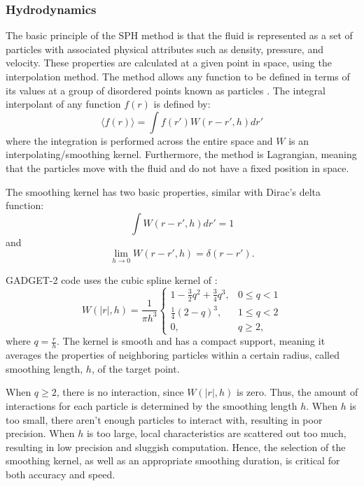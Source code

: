\subsubsection{Hydrodynamics}

The basic principle of the SPH method is that the fluid is represented as a set of particles with associated physical attributes such as density, pressure, and velocity. These properties are calculated at a given point in space, using the interpolation method. The method allows any function to be defined in terms of its values at a group of disordered points known as particles \citep{monaghan1982particle}. The integral interpolant of any function $f(r)$ is defined by:
\begin{equation}\label{eq:interpolant}
    \langle f(r) \rangle = \int f(r') W(r-r',h) dr'
\end{equation}
where the integration is performed across the entire space and $W$ is an interpolating/smoothing kernel. Furthermore, the method is Lagrangian, meaning that the particles move with the fluid and do not have a fixed position in space.

The smoothing kernel has two basic properties, similar with Dirac's delta function:
\begin{equation}\label{eq:kernel_property_1}
    \int W(r-r',h) dr' = 1
\end{equation}
and
\begin{equation}\label{eq:kernel_property_2}
   \lim_{h\to0} W(r-r',h) = \delta(r-r').
\end{equation}

GADGET-2 code uses the cubic spline kernel of \cite{monaghan1985refined}:
\begin{equation}\label{eq:spline_kernel}
  W(|r|,h) = \frac{1}{\pi h^3}
    \begin{cases}
      1 - \frac{3}{2}q^2 + \frac{3}{4}q^3, & 0 \leq q < 1\\
      \frac{1}{4}(2 - q)^3, & 1 \leq q <2 \\
      0, &  q \geq 2,
    \end{cases}      
\end{equation}
where $q = \frac{r}{h}$. The kernel is smooth and has a compact support, meaning it averages the properties of neighboring particles within a certain radius, called smoothing length, $h$, of the target point.  

When $q \geq 2$, there is no interaction, since $W(|r|,h)$ is zero. Thus, the amount of interactions for each particle is determined by the smoothing length $h$. When $h$ is too small, there aren't enough particles to interact with, resulting in poor precision. When $h$ is too large, local characteristics are scattered out too much, resulting in low precision and sluggish computation. Hence, the selection of the smoothing kernel, as well as an appropriate smoothing duration, is critical for both accuracy and speed. 

